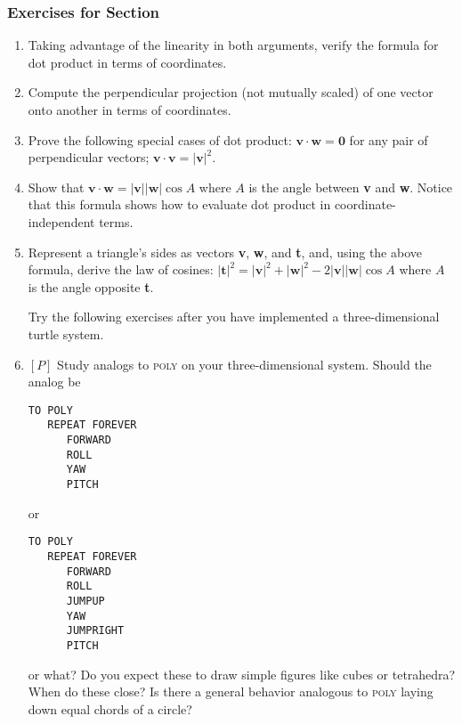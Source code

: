 \documentclass{book}
\begin{document}
\subsubsection{Exercises for Section \thesection}
\begin{enumerate}
\item Taking advantage of the linearity in both arguments, verify the
formula for dot product in terms of coordinates.
\item Compute the perpendicular projection (not mutually scaled) of one
vector onto another in terms of coordinates.  
\item Prove the following special cases of dot product: $\mathbf{v} \cdot \mathbf{w} = \mathbf{0}$ for any
pair of perpendicular vectors; $\mathbf{v} \cdot \mathbf{v} = |\mathbf{v}|^2$.  
\item Show that $\mathbf{v} \cdot \mathbf{w} = |\mathbf{v}||\mathbf{w}| \cos A$ where $A$ is the angle between \textbf{v} and \textbf{w}.
Notice that this formula shows how to evaluate dot product in coordinate-independent terms.  
\item Represent a triangle's sides as vectors \textbf{v}, \textbf{w}, and \textbf{t}, and, using the
above formula, derive the law of cosines:
$|\mathbf{t}|^2 = |\mathbf{v}|^2 + |\mathbf{w}|^2 - 2|\mathbf{v}||\mathbf{w}| \cos A$
where $A$ is the angle opposite \textbf{t}.  

Try the following exercises after you have implemented a three-dimensional turtle system.

\item $[P]$ Study analogs to \textsc{poly} on your three-dimensional system. Should
the analog be

\begin{verbatim}
TO POLY
   REPEAT FOREVER
      FORWARD
      ROLL 
      YAW
      PITCH
\end{verbatim}
or
\begin{verbatim}
TO POLY
   REPEAT FOREVER
      FORWARD
      ROLL
      JUMPUP
      YAW
      JUMPRIGHT
      PITCH
\end{verbatim}
or what? Do you expect these to draw simple figures like cubes or tetrahedra? When do these close? Is there a general behavior analogous to
\textsc{poly} laying down equal chords of a circle?  


\end{enumerate}
\end{document}
